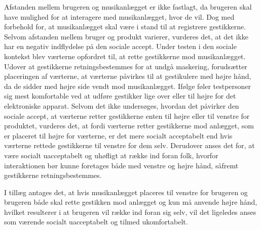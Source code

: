 Afstanden mellem brugeren og musikanlægget er ikke fastlagt, da brugeren skal have mulighed for at interagere med musikanlægget, hvor de vil. Dog med forbehold for, at musikanlægget skal være i stand til at registrere gestikkerne. Selvom afstanden mellem bruger og produkt varierer, vurderes det, at det ikke har en negativ indflydelse på den sociale accept.\blankline
%
Under testen i den sociale kontekst blev værterne opfordret til, at rette gestikkerne mod musikanlægget. Udover at gestikkerne retningsbestemmes for at undgå maskering, forudsætter placeringen af værterne, at værterne påvirkes til at gestikulere med højre hånd, da de sidder med højre side vendt mod musikanlægget. Ifølge \textcite[s. 197]{PDF:AreYouComfortableDoingThat} føler testpersoner sig mest komfortable ved at udføre gestikker lige over eller til højre for det elektroniske apparat. Selvom det ikke undersøges, hvordan det påvirker den sociale accept, at værterne retter gestikkerne enten til højre eller til venstre for produktet, vurderes det, at fordi værterne retter gestikkerne mod anlægget, som er placeret til højre for værterne, er det mere socialt acceptabelt end hvis værterne rettede gestikkerne til venstre for dem selv. Derudover anses det for, at være socialt uacceptabelt og uhøfligt at række ind foran folk, hvorfor interaktionen bør kunne foretages både med venstre og højre hånd, såfremt gestikkerne retningsbestemmes. 

I tillæg antages det, at hvis musikanlægget placeres til venstre for brugeren og brugeren både skal rette gestikken mod anlægget og kun må anvende højre hånd, hvilket resulterer i at brugeren vil række ind foran sig selv, vil det ligeledes anses som værende socialt uacceptabelt og tilmed ukomfortabelt. 
